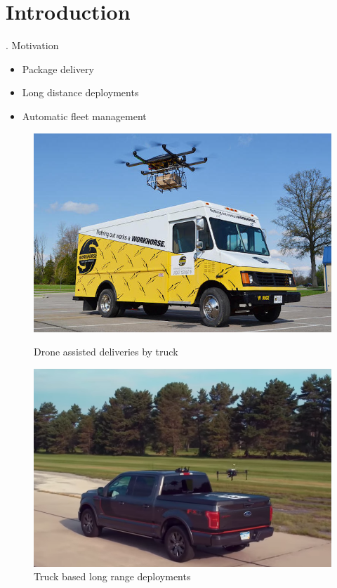 \section{Introduction}

\begin{frame}{\thesection. \insertsection}
	Motivation
	\begin{itemize}
		\item Package delivery
		\item Long distance deployments
		\item Automatic fleet management
	\end{itemize}
	\begin{figure}[ht]
        \begin{minipage}[b]{0.45\linewidth}
            \centering
            \includegraphics[width=\textwidth]{figures/ups.jpg}
            \caption{Drone assisted deliveries by truck}
            \label{fig:a}
        \end{minipage}
        \hspace{0.5cm}
        \begin{minipage}[b]{0.45\linewidth}
            \centering
            \includegraphics[width=\textwidth]{figures/dji.png}
            \caption{Truck based long range deployments}
            \label{fig:b}
        \end{minipage}
    \end{figure}
\end{frame}


